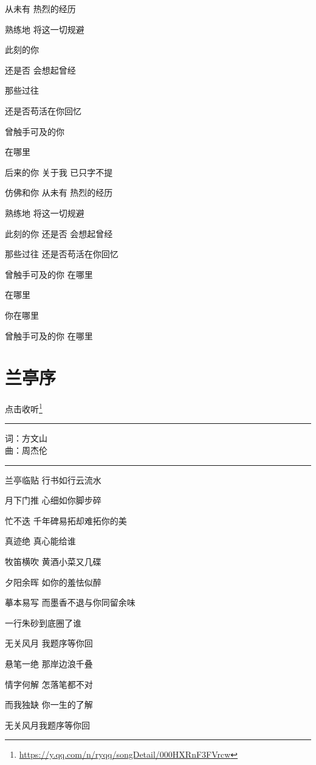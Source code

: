 \documentclass[]{ctexbook}
\renewcommand{\href}[2]{#2\footnote{\url{#1}}}
\begin{document}
从未有 热烈的经历

熟练地 将这一切规避

此刻的你

还是否 会想起曾经

那些过往

还是否苟活在你回忆

曾触手可及的你

在哪里

后来的你 关于我 已只字不提

仿佛和你 从未有 热烈的经历

熟练地 将这一切规避

此刻的你 还是否 会想起曾经

那些过往 还是否苟活在你回忆

曾触手可及的你 在哪里

在哪里

你在哪里

曾触手可及的你 在哪里

\section*{兰亭序}\label{lantingxu}


\href{https://y.qq.com/n/ryqq/songDetail/000HXRnF3FVrcw}{点击收听}

\begin{center}\rule{0.5\linewidth}{0.5pt}\end{center}

词：方文山\\
曲：周杰伦

\begin{center}\rule{0.5\linewidth}{0.5pt}\end{center}

兰亭临贴 行书如行云流水

月下门推 心细如你脚步碎

忙不迭 千年碑易拓却难拓你的美

真迹绝 真心能给谁

牧笛横吹 黄酒小菜又几碟

夕阳余晖 如你的羞怯似醉

摹本易写 而墨香不退与你同留余味

一行朱砂到底圈了谁

无关风月 我题序等你回

悬笔一绝 那岸边浪千叠

情字何解 怎落笔都不对

而我独缺 你一生的了解

无关风月我题序等你回
\end{document}
